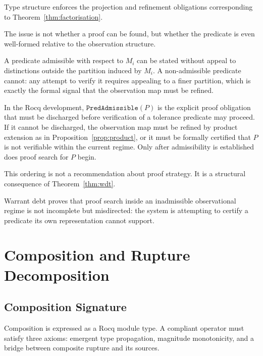 \documentclass[pdflatex,sn-mathphys-num]{sn-jnl}
\theoremstyle{plain}
\theoremstyle{definition}
\theoremstyle{remark}
\begin{document}
Type structure enforces the projection and refinement obligations
corresponding to Theorem~\ref{thm:factorisation}.

The issue is not whether a proof can be found, but whether the
predicate is even well-formed relative to the observation structure.

A predicate admissible with respect to $M_i$ can be stated without
appeal to distinctions outside the partition induced by $M_i$.
A non-admissible predicate cannot: any attempt to verify it requires
appealing to a finer partition, which is exactly the formal signal that
the observation map must be refined.

In the Rocq development, $\mathtt{PredAdmissible}(P)$ is the explicit
proof obligation that must be discharged before verification of a
tolerance predicate may proceed.
If it cannot be discharged, the observation map must be refined by
product extension as in Proposition~\ref{prop:product}, or it must be
formally certified that $P$ is not verifiable within the current
regime.
Only after admissibility is established does proof search for $P$
begin.

This ordering is not a recommendation about proof strategy.
It is a structural consequence of Theorem~\ref{thm:wdt}.

Warrant debt proves that proof search inside an inadmissible
observational regime is not incomplete but misdirected: the system is
attempting to certify a predicate its own representation cannot
support.

\section{Composition and Rupture Decomposition}
\label{sec:composition}

\subsection{Composition Signature}

Composition is expressed as a Rocq module type.
A compliant operator must satisfy three axioms: emergent type
propagation, magnitude monotonicity, and a bridge between composite
rupture and its sources.
\end{document}
